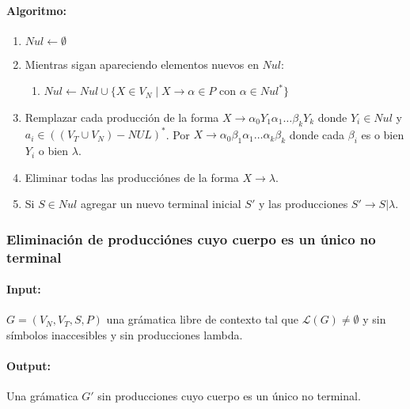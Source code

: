 \paragraph{Algoritmo:}
\begin{enumerate}
  \item \(Nul \leftarrow \emptyset\)
  \item Mientras sigan apareciendo elementos nuevos en \(Nul\):
        \begin{enumerate}
          \item[] \(Nul\leftarrow Nul\cup\{X\in V_N\mid X\to\alpha\in P\) con \(\alpha\in Nul^* \}\)
        \end{enumerate}
  \item Remplazar cada producción de la forma \(X\to \alpha_0Y_1\alpha_1\dots\beta_kY_k\) donde \(Y_i\in Nul\) y \(a_i \in ((V_T\cup V_N) - NUL)^*\). Por \(X\to \alpha_0\beta_1\alpha_1\dots\alpha_k\beta_k\) donde cada \(\beta_i\) es o bien \(Y_i\) o bien \(\lambda\).
  \item Eliminar todas las producciónes de la forma \(X\to\lambda\).
  \item Si \(S\in Nul\) agregar un nuevo terminal inicial \(S'\) y las producciones \(S'\to S | \lambda\).
\end{enumerate}

\subsubsection{Eliminación de producciónes cuyo cuerpo es un único no terminal}
\paragraph{Input:} \(G = (V_N, V_T, S, P)\) una grámatica libre de contexto tal que \(\mathcal{L}(G)\neq\emptyset\) y sin símbolos inaccesibles y sin producciones lambda.

\paragraph{Output:} Una grámatica \(G'\) sin producciones cuyo cuerpo es un único no terminal.

